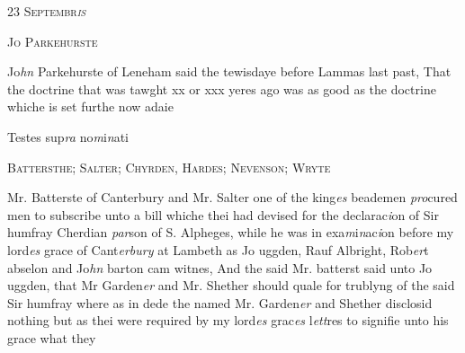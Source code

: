\documentclass[12pt, a4paper]{book}
\begin{document}
               
				\begin{center} \begin{large} {\scshape 
                  23 Septembr\textit{is}
               } \end{large} \end{center}
			
               
                  
				\begin{center}  {\scshape Jo Parkehurste}  \end{center}
			
               	
               		
				\marginpar[\vspace{0.5cm}{\textcolor{Gray}{seditious}}]{}
			
               		
		\ifthenelse{\isodd{\thepage}}
		{\reversemarginpar}
		{\normalmarginpar}
		Jo\textit{hn} Parkehurste of Leneham said the tewisdaye
  before Lammas last past, That the doctrine that
 was tawght xx or xxx yeres ago was as
 good as the doctrine whiche is set furthe now adaie
               		
		\ifthenelse{\isodd{\thepage}}
		{\reversemarginpar}
		{\normalmarginpar}
		Testes sup\textit{ra} no\textit{m}i\textit{n}ati
               	
 

               
               	
				\begin{center}  {\scshape Battersthe; Salter; Chyrden, Hardes; Nevenson; Wryte}  \end{center}
			
               	
               		
		\ifthenelse{\isodd{\thepage}}
		{\reversemarginpar}
		{\normalmarginpar}
		Mr. Batterste of Canterbury and Mr. Salter
 one of the king\textit{es} beademen \textit{pro}cured men to subscribe
 unto a bill whiche thei had devised for the declarac\textit{i}on
               			of Sir humfray Cherdian \textit{par}son of S. Alpheges, while
               			he was in exa\textit{m}i\textit{n}ac\textit{i}on before my lord\textit{es} grace of Cant\textit{erbury} at
               			Lambeth as Jo uggden, Rauf Albright, Rob\textit{er}t abselon and
               			Jo\textit{hn} barton cam witnes, And the said Mr. batterst said
               			unto Jo uggden, that Mr Garden\textit{er} and Mr. Shether
               			should quale for trublyng of the said Sir humfray
               			where as in dede the named Mr. Garden\textit{er} and Shether
 disclosid nothing but as thei were required by my
 lord\textit{es} grac\textit{es} l\textit{ett}res to signifie unto his grace what they
               		
\end{document}
